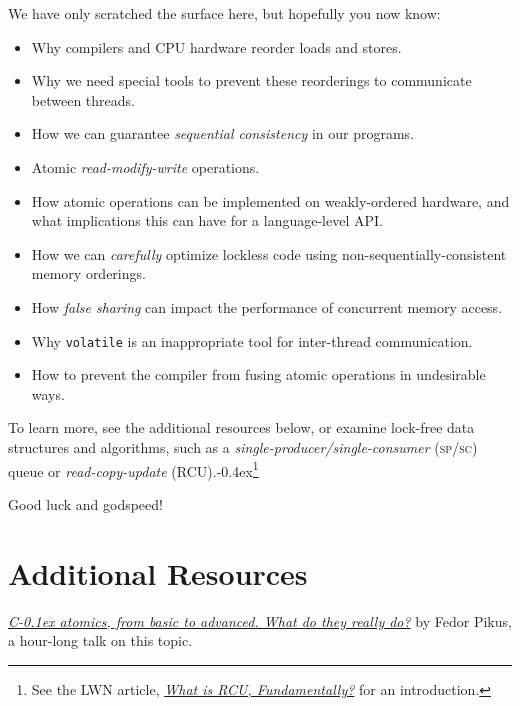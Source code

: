 \documentclass[fontsize=10pt, oneside]{scrartcl}
\newcommand{\punckern}{\kern-0.4ex}
\newcommand{\monobox}[1]{\mbox{\texttt{#1}}}
\newcommand{\keyword}[1]{\monobox{\color{darkGreen}#1}}
\newcommand{\cplusplus}[1]{C\kern-0.1ex\raisebox{0.15ex}{\texttt{++}}}
\newcommand{\introduce}[1]{\textit{#1}}
\begin{document}
We have only scratched the surface here, but hopefully you now know:
\begin{itemize}
\item Why compilers and \textsc{CPU} hardware reorder loads and stores.
\item Why we need special tools to prevent these reorderings to communicate between threads.
\item How we can guarantee \introduce{sequential consistency} in our programs.
\item Atomic \introduce{read-modify-write} operations.
\item How atomic operations can be implemented on weakly-ordered hardware,
      and what implications this can have for a language-level \textsc{API}.
\item How we can \emph{carefully} optimize lockless code using non-sequentially-consistent memory orderings.
\item How \introduce{false sharing} can impact the performance of concurrent memory access.
\item Why \keyword{volatile} is an inappropriate tool for inter-thread communication.
\item How to prevent the compiler from fusing atomic operations in undesirable ways.
\end{itemize}
To learn more, see the additional resources below,
or examine lock-free data structures and algorithms,
such as a \introduce{single-producer/single-consumer} (\textsc{sp/sc}) queue or \introduce{read-copy-update}
(\textsc{RCU}).\punckern\footnote{%
See the LWN article,
\href{https://lwn.net/Articles/262464/}{\textit{What is RCU, Fundamentally?}} for an introduction.}

\vspace{\baselineskip}
\noindent Good luck and godspeed!
\newpage

\appendix
\setcounter{secnumdepth}{0}
\setfootnoterule{0pt}

\setlength\parskip{\baselineskip}
\setlength\parindent{0pt}
\section{Additional Resources}

\href{https://www.youtube.com/watch?v=ZQFzMfHIxng}{%
\textit{\cplusplus{} atomics, from basic to advanced. What do they really do?}}
by Fedor Pikus,
a hour-long talk on this topic.
\end{document}
